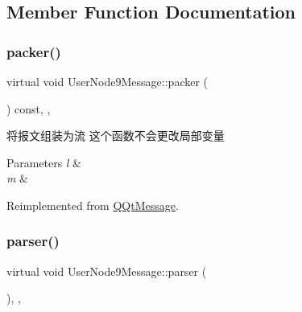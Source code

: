 \subsection{Member Function Documentation}
\mbox{\label{class_user_node9_message_afab1c33ef6cc9ed0f0dff1adc24a156c}} 
\subsubsection{\texorpdfstring{packer()}{packer()}}
{\footnotesize\ttfamily virtual void User\+Node9\+Message\+::packer (\begin{DoxyParamCaption}\item[{Q\+Byte\+Array \&}]{ }\end{DoxyParamCaption}) const\hspace{0.3cm}{\ttfamily [inline]}, {\ttfamily [override]}, {\ttfamily [virtual]}}



将报文组装为流 这个函数不会更改局部变量 


\begin{DoxyParams}{Parameters}
{\em l} & \\
\hline
{\em m} & \\
\hline
\end{DoxyParams}


Reimplemented from \mbox{\hyperlink{class_q_qt_message_af1885c2c3628495808dca66ee8d72e14}{Q\+Qt\+Message}}.

\mbox{\label{class_user_node9_message_a77088d56f6b1f98e9fdcde83de5780e7}} 
\subsubsection{\texorpdfstring{parser()}{parser()}}
{\footnotesize\ttfamily virtual void User\+Node9\+Message\+::parser (\begin{DoxyParamCaption}\item[{const Q\+Byte\+Array \&}]{ }\end{DoxyParamCaption})\hspace{0.3cm}{\ttfamily [inline]}, {\ttfamily [override]}, {\ttfamily [virtual]}}



